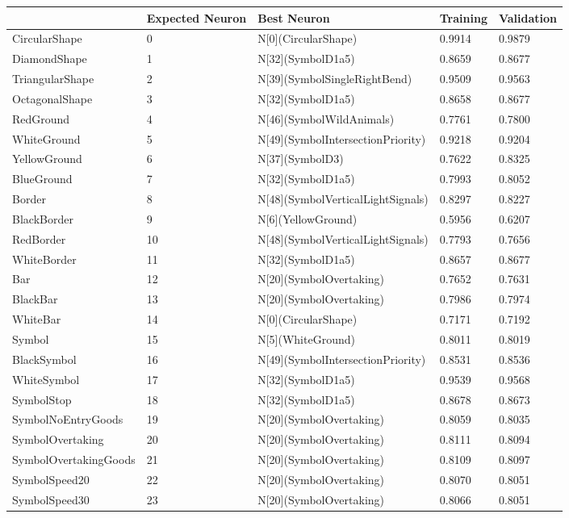 \begin{tabular}{lllll}
\toprule
 & Expected Neuron & Best Neuron & Training & Validation \\
\midrule
CircularShape & 0 & N[0](CircularShape) & 0.9914 & 0.9879 \\
DiamondShape & 1 & N[32](SymbolD1a5) & 0.8659 & 0.8677 \\
TriangularShape & 2 & N[39](SymbolSingleRightBend) & 0.9509 & 0.9563 \\
OctagonalShape & 3 & N[32](SymbolD1a5) & 0.8658 & 0.8677 \\
RedGround & 4 & N[46](SymbolWildAnimals) & 0.7761 & 0.7800 \\
WhiteGround & 5 & N[49](SymbolIntersectionPriority) & 0.9218 & 0.9204 \\
YellowGround & 6 & N[37](SymbolD3) & 0.7622 & 0.8325 \\
BlueGround & 7 & N[32](SymbolD1a5) & 0.7993 & 0.8052 \\
Border & 8 & N[48](SymbolVerticalLightSignals) & 0.8297 & 0.8227 \\
BlackBorder & 9 & N[6](YellowGround) & 0.5956 & 0.6207 \\
RedBorder & 10 & N[48](SymbolVerticalLightSignals) & 0.7793 & 0.7656 \\
WhiteBorder & 11 & N[32](SymbolD1a5) & 0.8657 & 0.8677 \\
Bar & 12 & N[20](SymbolOvertaking) & 0.7652 & 0.7631 \\
BlackBar & 13 & N[20](SymbolOvertaking) & 0.7986 & 0.7974 \\
WhiteBar & 14 & N[0](CircularShape) & 0.7171 & 0.7192 \\
Symbol & 15 & N[5](WhiteGround) & 0.8011 & 0.8019 \\
BlackSymbol & 16 & N[49](SymbolIntersectionPriority) & 0.8531 & 0.8536 \\
WhiteSymbol & 17 & N[32](SymbolD1a5) & 0.9539 & 0.9568 \\
SymbolStop & 18 & N[32](SymbolD1a5) & 0.8678 & 0.8673 \\
SymbolNoEntryGoods & 19 & N[20](SymbolOvertaking) & 0.8059 & 0.8035 \\
SymbolOvertaking & 20 & N[20](SymbolOvertaking) & 0.8111 & 0.8094 \\
SymbolOvertakingGoods & 21 & N[20](SymbolOvertaking) & 0.8109 & 0.8097 \\
SymbolSpeed20 & 22 & N[20](SymbolOvertaking) & 0.8070 & 0.8051 \\
SymbolSpeed30 & 23 & N[20](SymbolOvertaking) & 0.8066 & 0.8051 \\

\end{tabular}
